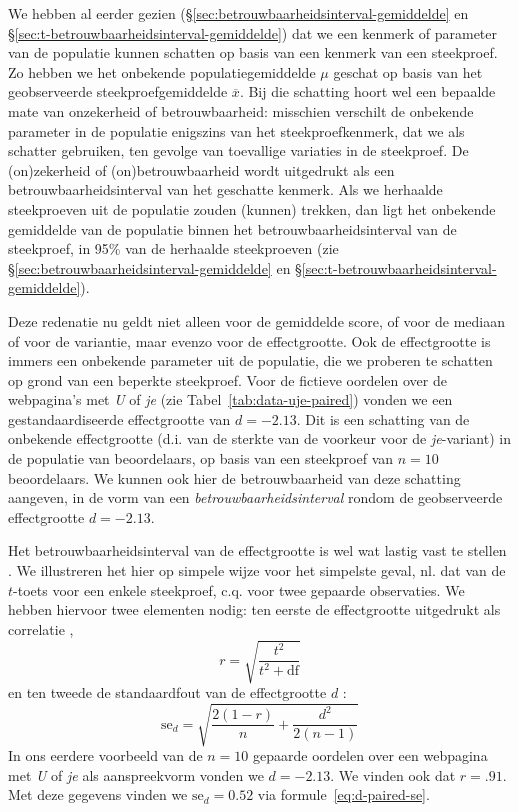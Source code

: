 \documentclass[
]{book}
\begin{document}
We hebben al eerder gezien
(§\ref{sec:betrouwbaarheidsinterval-gemiddelde} en
§\ref{sec:t-betrouwbaarheidsinterval-gemiddelde}) dat we een kenmerk of
parameter van de populatie kunnen schatten op basis van een kenmerk van
een steekproef. Zo hebben we het onbekende populatiegemiddelde \(\mu\)
geschat op basis van het geobserveerde steekproefgemiddelde
\(\overline{x}\). Bij die schatting hoort wel een bepaalde mate van
onzekerheid of betrouwbaarheid: misschien verschilt de onbekende
parameter in de populatie enigszins van het steekproefkenmerk, dat we
als schatter gebruiken, ten gevolge van toevallige variaties in de
steekproef. De (on)zekerheid of (on)betrouwbaarheid wordt uitgedrukt als
een betrouwbaarheidsinterval van het geschatte kenmerk. Als we herhaalde
steekproeven uit de populatie zouden (kunnen) trekken, dan ligt het
onbekende gemiddelde van de populatie binnen het
betrouwbaarheidsinterval van de steekproef, in 95\% van de herhaalde
steekproeven (zie §\ref{sec:betrouwbaarheidsinterval-gemiddelde} en
§\ref{sec:t-betrouwbaarheidsinterval-gemiddelde}).

Deze redenatie nu geldt niet alleen voor de gemiddelde score, of voor de
mediaan of voor de variantie, maar evenzo voor de effectgrootte. Ook de
effectgrootte is immers een onbekende parameter uit de populatie, die we
proberen te schatten op grond van een beperkte steekproef. Voor de
fictieve oordelen over de webpagina's met \emph{U} of \emph{je} (zie
Tabel~\ref{tab:data-uje-paired}) vonden we een gestandaardiseerde
effectgrootte van \(d=-2.13\). Dit is een schatting van de onbekende
effectgrootte (d.i. van de sterkte van de voorkeur voor de \emph{je}-variant)
in de populatie van beoordelaars, op basis van een steekproef van \(n=10\)
beoordelaars. We kunnen ook hier de betrouwbaarheid van deze schatting
aangeven, in de vorm van een \emph{betrouwbaarheidsinterval} rondom de
geobserveerde effectgrootte \(d=-2.13\).

Het betrouwbaarheidsinterval van de effectgrootte is wel wat lastig vast
te stellen \citep{Naka07, Chen15}. We illustreren het hier op simpele wijze
voor het simpelste geval, nl. dat van de \(t\)-toets voor een enkele
steekproef, c.q. voor twee gepaarde observaties. We hebben hiervoor twee
elementen nodig: ten eerste de effectgrootte uitgedrukt als correlatie
\citep[ p.359, formule 12.1]{Rose08},
\[r = \sqrt{ \frac{t^2}{t^2+\textrm{df}} }\] en ten tweede de
standaardfout van de effectgrootte \(d\) \citep[ p.600, formule 18]{Naka07}:
\begin{equation}
  \label{eq:d-paired-se}
    \textrm{se}_d = \sqrt{ \frac{2(1-r)}{n} + \frac{d^2}{2(n-1)} }
\end{equation} In ons eerdere voorbeeld van de \(n=10\) gepaarde oordelen
over een webpagina met \emph{U} of \emph{je} als aanspreekvorm vonden we
\(d=-2.13\). We vinden ook dat \(r=.91\). Met deze gegevens vinden we
\(\textrm{se}_d = 0.52\) via formule~\eqref{eq:d-paired-se}.
\end{document}
